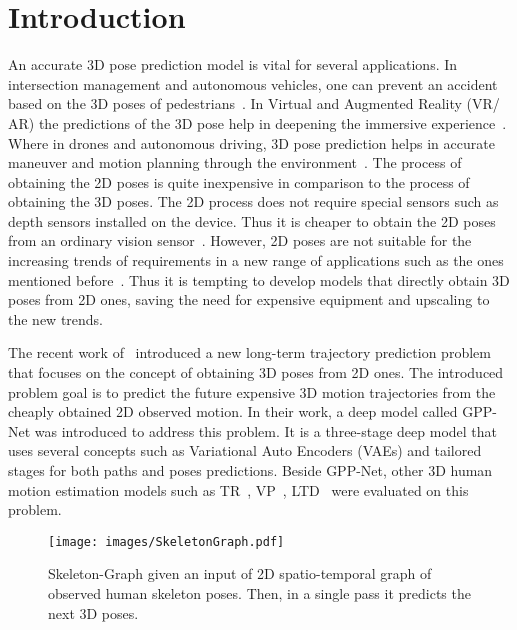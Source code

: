 \documentclass[10pt,twocolumn,letterpaper]{article}
\newcommand*{\ours}{Skeleton-Graph }
\begin{document}
\section{Introduction}
An accurate 3D pose prediction model is vital for several applications. In intersection management and autonomous vehicles, one can prevent an accident based on the 3D poses of pedestrians~\cite{gu2019efficient,ding2018vehicle,rodriguez20183d}. In Virtual and Augmented Reality (VR/ AR) the predictions of the 3D pose help in deepening the immersive experience~\cite{pohl2019neural}. Where in drones and autonomous driving, 3D pose prediction helps in accurate maneuver and motion planning through the environment~\cite{huang2018act,zhou2018human,huang2019learning,8695392}. The process of obtaining the 2D poses is quite inexpensive in comparison to the process of obtaining the 3D poses. The 2D process does not require special sensors such as depth sensors installed on the device. Thus it is cheaper to obtain the 2D poses from an ordinary vision sensor~\cite{bkak2016recent}. However, 2D poses are not suitable for the increasing trends of requirements in a new range of applications such as the ones mentioned before~\cite{sarafianos20163d,rogez2016mocap}. Thus it is tempting to develop models that directly obtain 3D poses from 2D ones, saving the need for expensive equipment and upscaling to the new trends. 

The recent work of~\cite{cao2020long} introduced a new long-term trajectory prediction problem that focuses on the concept of obtaining 3D poses from 2D ones. The introduced problem goal is to predict the future expensive 3D motion trajectories from the cheaply obtained 2D observed motion. In their work, a deep model called GPP-Net was introduced to address this problem. It is a three-stage deep model that uses several concepts such as Variational Auto Encoders (VAEs) and tailored stages for both paths and poses predictions. Beside GPP-Net, other 3D human motion estimation models such as TR~\cite{vaswani2017attention}, VP~\cite{pavllo20193d}, LTD~\cite{wei2019motion} were evaluated on this problem. 
\begin{figure}[t]

\begin{center}
\texttt{[image: images/SkeletonGraph.pdf]}
\end{center}
   \caption{\ours given an input of 2D spatio-temporal graph of observed human skeleton poses. Then, in a single pass it predicts the next 3D poses.}
\label{gr:teaser}
\end{figure}
\end{document}
